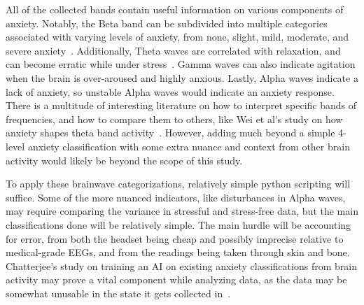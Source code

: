 \documentclass[journal]{IEEEtran}
\begin{document}
All of the collected bands contain useful information on various components of anxiety. Notably, the Beta band can be subdivided into multiple categories associated with varying levels of anxiety, from none, slight, mild, moderate, and severe anxiety~\cite{chatterjee_gavas_saha_2023}. Additionally, Theta waves are correlated with relaxation, and can become erratic while under stress~\cite{neurohealth_2019}. Gamma waves can also indicate agitation when the brain is over-aroused and highly anxious. Lastly, Alpha waves indicate a lack of anxiety, so unstable Alpha waves would indicate an anxiety response. There is a multitude of interesting literature on how to interpret specific bands of frequencies, and how to compare them to others, like Wei et al's study on how anxiety shapes theta band activity~\cite{wei_sun_long_2025}. However, adding much beyond a simple 4-level anxiety classification with some extra nuance and context from other brain activity would likely be beyond the scope of this study.

To apply these brainwave categorizations, relatively simple python scripting will suffice. Some of the more nuanced indicators, like disturbances in Alpha waves, may require comparing the variance in stressful and stress-free data, but the main classifications done will be relatively simple. The main hurdle will be accounting for error, from both the headset being cheap and possibly imprecise relative to medical-grade EEGs, and from the readings being taken through skin and bone. Chatterjee's study on training an AI on existing anxiety classifications from brain activity may prove a vital component while analyzing data, as the data may be somewhat unusable in the state it gets collected in~\cite{chatterjee_gavas_saha_2023}.
\end{document}

